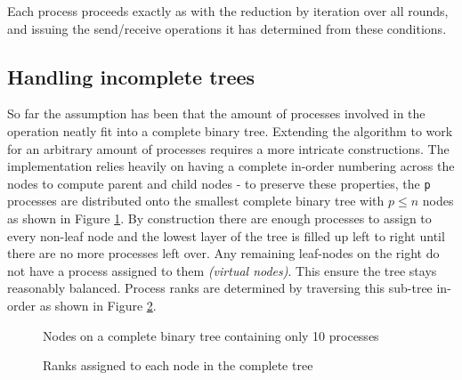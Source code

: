 \documentclass[twoside,twocolumn,hidelinks]{article}
\begin{document}
Each process proceeds exactly as with the reduction by iteration over all rounds, and issuing the send/receive operations it has determined from these conditions.

\subsection{Handling incomplete trees}\label{sec:handling_incomplete}
So far the assumption has been that the amount of processes involved in the operation neatly fit into a complete binary tree. Extending the algorithm to work for an arbitrary amount of processes requires a more intricate constructions. The implementation relies heavily on having a complete in-order numbering across the nodes to compute parent and child nodes - to preserve these properties, the \texttt{p} processes are distributed onto the smallest complete binary tree with $p \le n$ nodes as shown in Figure \ref{fig:tree_missing_processes}. By construction there are enough processes to assign to every non-leaf node and the lowest layer of the tree is filled up left to right until there are no more processes left over. Any remaining leaf-nodes on the right do not have a process assigned to them \textit{(virtual nodes)}. This ensure the tree stays reasonably balanced. Process ranks are determined by traversing this sub-tree in-order as shown in Figure \ref{fig:tree_process_ranks}.

\begin{figure}
      \centering
      \caption{Nodes on a complete binary tree containing only 10 processes}
      \label{fig:tree_missing_processes}
\end{figure}

\begin{figure}
      \centering
      \caption{Ranks assigned to each node in the complete tree}
      \label{fig:tree_process_ranks}
\end{figure}
\end{document}
